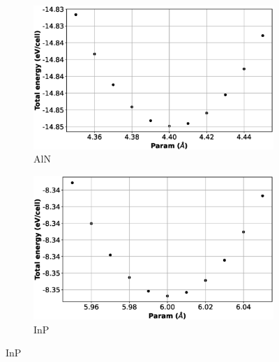 \begin{figure}[htb]
    \centering %
\begin{subfigure}{0.45\textwidth}
  \includegraphics[width=\linewidth]{images/aln_3d_opt.eps}
  \caption{AlN}
\end{subfigure}\hfil %
\begin{subfigure}{0.45\textwidth}
  \includegraphics[width=\linewidth]{images/inp_3d_opt.eps}
  \caption{InP}
\end{subfigure}

\medskip


\end{figure}
